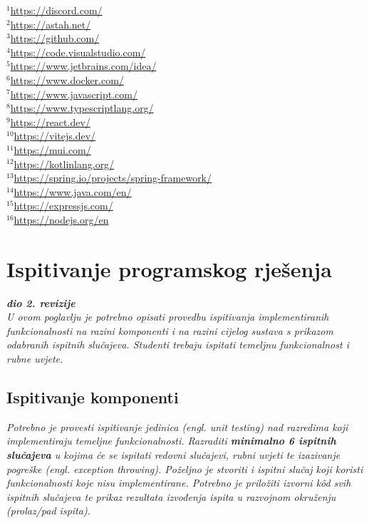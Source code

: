 \begin{footnotesize}
	\noindent $^1$\href{https://discord.com/}{https://discord.com/} \\
	$^2$\href{https://astah.net/}{https://astah.net/} \\
	$^3$\href{https://github.com/}{https://github.com/} \\
	$^4$\href{https://code.visualstudio.com/}{https://code.visualstudio.com/} \\
	$^5$\href{https://www.jetbrains.com/idea/}{https://www.jetbrains.com/idea/} \\
	$^6$\href{https://www.docker.com/}{https://www.docker.com/} \\
	$^7$\href{https://www.javascript.com/}{https://www.javascript.com/} \\
	$^8$\href{https://www.typescriptlang.org/}{https://www.typescriptlang.org/} \\
	$^9$\href{https://react.dev/}{https://react.dev/} \\
	$^{10}$\href{https://vitejs.dev/}{https://vitejs.dev/} \\
	$^{11}$\href{https://mui.com/}{https://mui.com/} \\
	$^{12}$\href{https://kotlinlang.org/}{https://kotlinlang.org/} \\
	$^{13}$\href{https://spring.io/projects/spring-framework/}{https://spring.io/projects/spring-framework/} \\
	$^{14}$\href{https://www.java.com/en/}{https://www.java.com/en/} \\
	$^{15}$\href{https://expressjs.com/}{https://expressjs.com/} \\
	$^{16}$\href{https://nodejs.org/en}{https://nodejs.org/en}
\end{footnotesize}
			
			
			\eject 
		
	
		\section{Ispitivanje programskog rješenja}
			
			\textbf{\textit{dio 2. revizije}}\\
			
			 \textit{U ovom poglavlju je potrebno opisati provedbu ispitivanja implementiranih funkcionalnosti na razini komponenti i na razini cijelog sustava s prikazom odabranih ispitnih slučajeva. Studenti trebaju ispitati temeljnu funkcionalnost i rubne uvjete.}
	
			
			\subsection{Ispitivanje komponenti}
			\textit{Potrebno je provesti ispitivanje jedinica (engl. unit testing) nad razredima koji implementiraju temeljne funkcionalnosti. Razraditi \textbf{minimalno 6 ispitnih slučajeva} u kojima će se ispitati redovni slučajevi, rubni uvjeti te izazivanje pogreške (engl. exception throwing). Poželjno je stvoriti i ispitni slučaj koji koristi funkcionalnosti koje nisu implementirane. Potrebno je priložiti izvorni kôd svih ispitnih slučajeva te prikaz rezultata izvođenja ispita u razvojnom okruženju (prolaz/pad ispita). }
			
